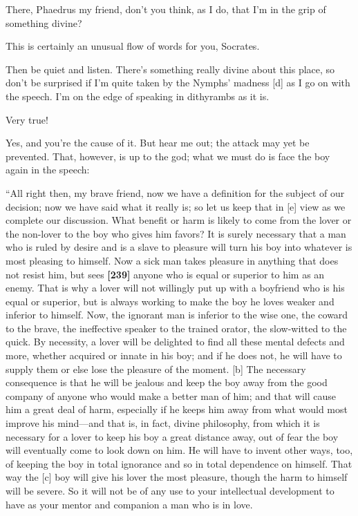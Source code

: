 There, Phaedrus my friend, don't you think, as I do, that I'm in the
grip of something divine?

\sayphaedrus This is certainly an unusual flow of words for you, Socrates.

\saysocrates Then be quiet and listen. There's something really divine
about this place, so don't be surprised if I'm quite taken by the
Nymphs' madness {[}d{]} as I go on with the speech. I'm on the edge of
speaking in dithyrambs
as it is.

\sayphaedrus Very true!

\saysocrates Yes, and you're the cause of it. But hear me out; the attack
may yet be prevented. That, however, is up to the god; what we must do
is face the boy again in the speech:

“All right then, my brave friend, now we have a definition for the
subject of our decision; now we have said what it really is; so let us
keep that in {[}e{]} view as we complete our discussion. What benefit or
harm is likely to come from the lover or the non-lover to the boy who
gives him favors? It is surely necessary that a man who is ruled by
desire and is a slave to pleasure will turn his boy into whatever is
most pleasing to himself. Now a sick man takes pleasure in anything that
does not resist him, but sees {\bf {[}239{]}} anyone who is equal or
superior to him as an enemy. That is why a lover will not willingly put
up with a boyfriend who is his equal or superior, but is always working
to make the boy he loves weaker and inferior to himself. Now, the
ignorant man is inferior to the wise one, the coward to the brave, the
ineffective speaker to the trained orator, the slow-witted to the quick.
By necessity, a lover will be delighted to find all these mental defects
and more, whether acquired or innate in his boy; and if he does not, he
will have to supply them or else lose the pleasure of the moment.
{[}b{]} The necessary consequence is that he will be jealous and keep
the boy away from the good company of anyone who would make a better man
of him; and that will cause him a great deal of harm, especially if he
keeps him away from what would most improve his mind---and that is, in
fact, divine philosophy, from which it is necessary for a lover to keep
his boy a great distance away, out of fear the boy will eventually come
to look down on him. He will have to invent other ways, too, of keeping
the boy in total ignorance and so in total dependence on himself. That
way the {[}c{]} boy will give his lover the most pleasure, though the
harm to himself will be severe. So it will not be of any use to your
intellectual development to have as your mentor and companion a man who
is in love.

